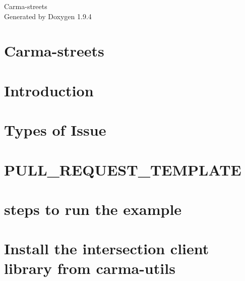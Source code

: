 \documentclass[twoside]{book}
\newcommand{\+}{\discretionary{\mbox{\scriptsize$\hookleftarrow$}}{}{}}
\newcommand{\clearemptydoublepage}{%
    \newpage{\pagestyle{empty}\cleardoublepage}%
  }
\begin{document}
  \raggedbottom
    \hypersetup{pageanchor=false,
                bookmarksnumbered=true,
                pdfencoding=unicode
               }
  \begin{titlepage}
  \vspace*{7cm}
  \begin{center}%
  {\Large Carma-\/streets}\\
  \vspace*{1cm}
  {\large Generated by Doxygen 1.9.4}\\
  \end{center}
  \end{titlepage}
  \clearemptydoublepage
  \tableofcontents
  \clearemptydoublepage
  \hypersetup{pageanchor=true}
\chapter{Carma-\/streets}
\label{index}\hypertarget{index}{}
\chapter{Introduction}
\label{md_doc__doxygen_mainpage}

\chapter{Types of Issue}
\label{md_docs_ISSUE_TEMPLATE}

\chapter{PULL\+\_\+\+REQUEST\+\_\+\+TEMPLATE}
\label{md_docs_PULL_REQUEST_TEMPLATE}

\chapter{steps to run the example}
\label{md_examples_kafka_examples_readme}

\chapter{Install the intersection client library from carma-\/utils}
\label{md_examples_qt_rest_clients_api_intersection_client_README}

\end{document}
